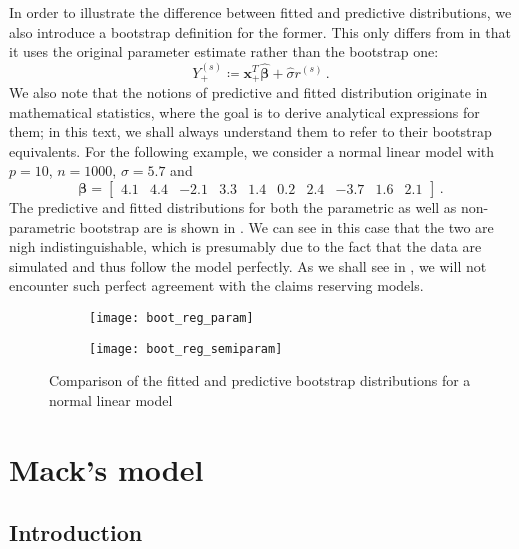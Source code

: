 \documentclass[a4paper]{book}
\begin{document}
In order to illustrate the difference between fitted and predictive distributions, we also introduce a bootstrap definition for the former. This only differs from  in that it uses the original parameter estimate rather than the bootstrap one:
\begin{equation} \label{eq:fit-dist}
  Y_+^{(s)} \coloneqq \mathbf{x}_+^T \widehat{\bm{\beta}} + \widehat{\sigma} r^{(s)} \,.
\end{equation}
We also note that the notions of predictive and fitted distribution originate in mathematical statistics, where the goal is to derive analytical expressions for them; in this text, we shall always understand them to refer to their bootstrap equivalents. For the following example, we consider a normal linear model with $p = 10$, $n = 1000$, $\sigma = 5.7$ and 
\begin{displaymath}
  \bm{\beta} = \begin{bmatrix} 4.1 & 4.4 & -2.1 & 3.3 & 1.4 & 0.2 & 2.4 & -3.7 & 1.6 & 2.1 \end{bmatrix} \,.
\end{displaymath}
The predictive and fitted distributions for both the parametric as well as non-parametric bootstrap are is shown in . We can see in this case that the two are nigh indistinguishable, which is presumably due to the fact that the data are simulated and thus follow the model perfectly. As we shall see in , we will not encounter such perfect agreement with the claims reserving models.

\begin{figure}[!htb]
  \begin{subfigure}{\linewidth}
    \texttt{[image: boot\_reg\_param]}
  \end{subfigure}
  \begin{subfigure}{\linewidth}
    \texttt{[image: boot\_reg\_semiparam]}
  \end{subfigure}
  \caption{Comparison of the fitted and predictive bootstrap distributions for a normal linear model}
  \label{fig:boot-reg}
\end{figure}

\chapter{Mack's model} \label{chapter:mack}

\section{Introduction} \label{sec:mack-intro}
\end{document}
